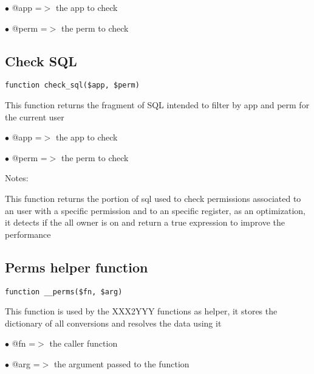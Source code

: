 \documentclass[a4paper]{book}
\begin{document}
\begin{compactitem}
\item[\color{myblue}$\bullet$] @app  =$>$ the app to check
\item[\color{myblue}$\bullet$] @perm =$>$ the perm to check
\end{compactitem}

\hypertarget{toc219}{}
\subsection{Check SQL}

\begin{lstlisting}
function check_sql($app, $perm)
\end{lstlisting}

This function returns the fragment of SQL intended to filter by app and
perm for the current user

\begin{compactitem}
\item[\color{myblue}$\bullet$] @app  =$>$ the app to check
\item[\color{myblue}$\bullet$] @perm =$>$ the perm to check
\end{compactitem}

Notes:

This function returns the portion of sql used to check permissions
associated to an user with a specific permission and to an specific
register, as an optimization, it detects if the all owner is on and
return a true expression to improve the performance

\hypertarget{toc220}{}
\subsection{Perms helper function}

\begin{lstlisting}
function __perms($fn, $arg)
\end{lstlisting}

This function is used by the XXX2YYY functions as helper, it stores the
dictionary of all conversions and resolves the data using it

\begin{compactitem}
\item[\color{myblue}$\bullet$] @fn  =$>$ the caller function
\item[\color{myblue}$\bullet$] @arg =$>$ the argument passed to the function
\end{compactitem}
\end{document}
